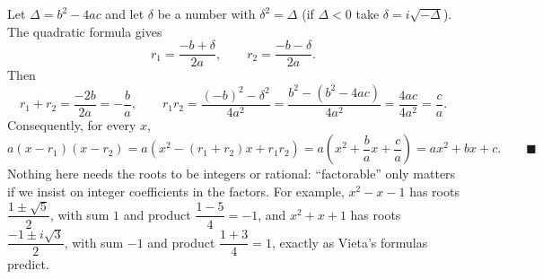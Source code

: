 Let $\Delta=b^2-4ac$ and let $\delta$ be a number with $\delta^2=\Delta$ (if $\Delta<0$ take $\delta=i\sqrt{-\Delta}$). The quadratic formula gives
\[
r_1=\dfrac{-b+\delta}{2a},\qquad r_2=\dfrac{-b-\delta}{2a}.
\]
Then
\[
r_1+r_2=\dfrac{-2b}{2a}=-\dfrac{b}{a},\qquad r_1r_2=\dfrac{(-b)^2-\delta^2}{4a^2}=\dfrac{b^2-(b^2-4ac)}{4a^2}=\dfrac{4ac}{4a^2}=\dfrac{c}{a}.
\]
Consequently, for every $x$,
\[
a(x-r_1)(x-r_2)=a\left(x^2-(r_1+r_2)x+r_1r_2\right)=a\left(x^2+\dfrac{b}{a}x+\dfrac{c}{a}\right)=ax^2+bx+c. \qquad\blacksquare
\]
Nothing here needs the roots to be integers or rational: ``factorable'' only matters if we insist on integer coefficients in the factors. For example, $x^2-x-1$ has roots $\dfrac{1\pm\sqrt5}{2}$, with sum $1$ and product $\dfrac{1-5}{4}=-1$, and $x^2+x+1$ has roots $\dfrac{-1\pm i\sqrt3}{2}$, with sum $-1$ and product $\dfrac{1+3}{4}=1$, exactly as Vieta's formulas predict.
